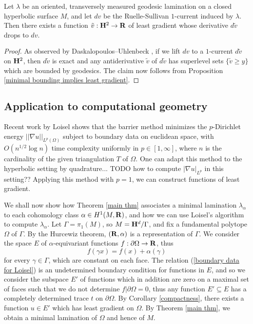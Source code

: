 \begin{corollary}\label{ruelle sullivan antiderivative}
Let $\lambda$ be an oriented, transversely measured geodesic lamination on a closed hyperbolic surface $M$, and let $dv$ be the Ruelle-Sullivan $1$-current induced by $\lambda$.
Then there exists a function $\tilde v: \mathbf H^2 \to \mathbf{R}$ of least gradient whose derivative $d\tilde v$ drops to $dv$.
\end{corollary}
\begin{proof}
As observed by Daskalopoulos--Uhlenbeck \cite[\S9]{daskalopoulos2020transverse}, if we lift $dv$ to a $1$-current $d\tilde v$ on $\mathbf H^2$, then $d\tilde v$ is exact and any antiderivative $\tilde v$ of $d\tilde v$ has superlevel sets $\{\tilde v \geq y\}$ which are bounded by geodesics.
The claim now follows from Proposition \ref{minimal bounding implies least gradient}.
\end{proof}


\subsection{Application to computational geometry}
Recent work by Loisel \cite{Loisel20} shows that the barrier method minimizes the $p$-Dirichlet energy $||\nabla u||_{L^p(\Omega)}$
subject to boundary data on euclidean space, with $O(n^{1/2} \log n)$ time complexity uniformly in $p \in [1, \infty]$, where $n$ is the cardinality of the given triangulation $T$ of $\Omega$.
One can adapt this method to the hyperbolic setting by quadrature... TODO how to compute $|\nabla u|_{L^p}$ in this setting??
Applying this method with $p = 1$, we can construct functions of least gradient.

We shall now show how Theorem \ref{main thm} associates a minimal lamination $\lambda_\alpha$ to each cohomology class $\alpha \in H^1(M, \mathbf{R})$, and how we can use Loisel's algorithm to compute $\lambda_\alpha$.
Let $\Gamma = \pi_1(M)$, so $M = \mathbf H^d/\Gamma$, and fix a fundamental polytope $\Omega$ of $\Gamma$.
By the Hurcewiz theorem, $(\mathbf{R}, \alpha)$ is a representation of $\Gamma$.
We consider the space $E$ of $\alpha$-equivariant functions $f: \partial \Omega \to \mathbf{R}$, thus
\begin{equation}\label{boundary data for Loisel}
f(\gamma x) = f(x) + \alpha(\gamma)
\end{equation}
for every $\gamma \in \Gamma$, which are constant on each face.
The relation (\ref{boundary data for Loisel}) is an undetermined boundary condition for functions in $E$, and so we consider the subspace $E'$ of functions which in addition are zero on a maximal set of faces such that we do not determine $f|\partial \Omega = 0$, thus any function $E' \subseteq E$ has a completely determined trace $t$ on $\partial \Omega$.
By Corollary \ref{compactness}, there exists a function $u \in E'$ which has least gradient on $\Omega$.
By Theorem \ref{main thm}, we obtain a minimal lamination of $\Omega$ and hence of $M$. 


